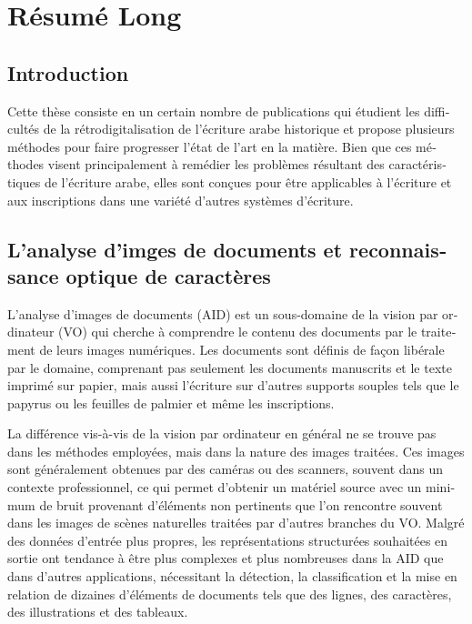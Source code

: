 \chapter{Résumé Long}

\begin{french}

\section{Introduction}

Cette thèse consiste en un certain nombre de publications qui étudient les
difficultés de la rétrodigitalisation de l'écriture arabe historique et propose
plusieurs méthodes pour faire progresser l'état de l'art en la matière. Bien
que ces méthodes visent principalement à remédier les problèmes résultant des
caractéristiques de l'écriture arabe, elles sont conçues pour être applicables
à l'écriture et aux inscriptions dans une variété d'autres systèmes d'écriture.

\section{L'analyse d'imges de documents et reconnaissance optique de caractères}

L'analyse d'images de documents (AID) est un sous-domaine de la vision par
ordinateur (VO) qui cherche à comprendre le contenu des documents par
le traitement de leurs images numériques.  Les documents sont définis
de façon libérale par le domaine, comprenant pas seulement les
documents manuscrits et le texte imprimé sur papier, mais aussi
l'écriture sur d'autres supports souples tels que le papyrus ou les
feuilles de palmier et même les inscriptions.

La différence vis-à-vis de la vision par ordinateur en général ne se trouve pas
dans les méthodes employées, mais dans la nature des images traitées.
Ces images sont généralement obtenues par des caméras ou des scanners,
souvent dans un contexte professionnel, ce qui permet d'obtenir un
matériel source avec un minimum de bruit provenant d'éléments non
pertinents que l'on rencontre souvent dans les images de scènes
naturelles traitées par d'autres branches du VO. Malgré des données d'entrée
plus propres, les représentations structurées souhaitées en sortie ont
tendance à être plus complexes et plus nombreuses dans la AID que dans
d'autres applications, nécessitant la détection, la classification et
la mise en relation de dizaines d'éléments de documents tels que des
lignes, des caractères, des illustrations et des tableaux.


\end{french}
